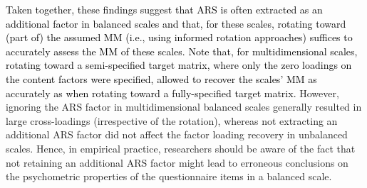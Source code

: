\documentclass[a4paper,man,natbib]{apa6}
\begin{document}
\begin{linenumbers}
\textcolor{black}{Taken together, these findings suggest that ARS is often extracted as an additional factor in balanced scales and that, for these scales, rotating toward (part of) the assumed MM (i.e., using informed rotation approaches) suffices to accurately assess the MM of these scales. Note that, for multidimensional scales, rotating toward a semi-specified target matrix, where only the zero loadings on the content factors were specified, allowed to recover the scales' MM as accurately as when rotating toward a fully-specified target matrix.} %
However, ignoring the ARS factor in multidimensional balanced scales generally resulted in large cross-loadings (irrespective of the rotation), whereas not extracting an additional ARS factor did not affect the factor loading recovery in unbalanced scales. Hence, in empirical practice, researchers should be aware of the fact that not retaining an additional ARS factor might lead to erroneous conclusions on the psychometric properties of the questionnaire items in a balanced scale.










\end{linenumbers}
\end{document}

